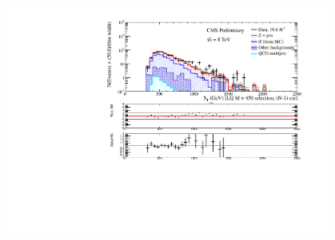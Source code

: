 \documentclass[bigger]{beamer}
\begin{document}
\begin{frame}
\begin{columns}
\begin{column}{0.55\textwidth}
\centering
\includegraphics[width=0.8\textwidth]{fig/ee/nMinus1/sT_eejj_MeeAndMejLQ450_eejj.pdf}
\end{column}
\end{columns}
\end{frame}
\end{document}
